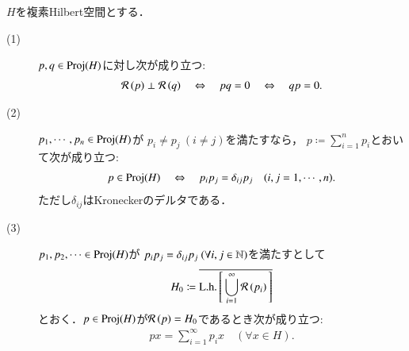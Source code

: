	\begin{screen}
		\begin{prp}
			$H$を複素Hilbert空間とする．
			\begin{description}
				\item[(1)] $p,q \in \mathrm{Proj}( H )$に対し次が成り立つ:
					\begin{align}
						\mathcal{R}\left(p\right) \perp \mathcal{R}\left(q\right)
						\quad \Leftrightarrow \quad  pq = 0
						\quad \Leftrightarrow \quad  qp = 0.
					\end{align}
				
				\item[(2)] 
					$p_1,\cdots,p_n \in \mathrm{Proj}( H )$が
					$p_i \neq p_j\ (i \neq j)$を満たすなら，
					$p \coloneqq \sum_{i=1}^{n} p_i$とおいて次が成り立つ:
					\begin{align}
						p \in \mathrm{Proj}( H )
						\quad \Leftrightarrow \quad p_i p_j = \delta_{ij} p_j \quad (i,j = 1,\cdots,n).
					\end{align}
					ただし$\delta_{ij}$はKroneckerのデルタである．
				
				\item[(3)] 
					$p_1,p_2,\cdots \in \mathrm{Proj}( H )$が
					$p_i p_j = \delta_{ij} p_j \ (\forall i,j \in \mathbb{N})$を満たすとして
					\begin{align}
						H_0 \coloneqq \overline{\mathrm{L.h.}\left[\, \bigcup_{i=1}^{\infty}\mathcal{R}\left(p_i\right)\, \right]}
					\end{align}
					とおく．$p \in \mathrm{Proj}( H )$が$\mathcal{R}\left(p\right) = H_0$であるとき次が成り立つ:
					\begin{align}
						px = \sum_{i=1}^{\infty} p_i x \quad (\forall x \in H).
					\end{align}
			\end{description}
			\label{prp:orthogonal_projection_product_sum}
		\end{prp}
	\end{screen}